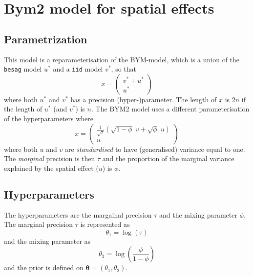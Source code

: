 \documentclass[a4paper,11pt]{article}
\begin{document}
\section*{Bym2 model for spatial effects}

\subsection*{Parametrization}

This model is a reparameterisation of the BYM-model, which is a union
of the \lstinline$besag$ model $u^{*}$ and a \lstinline$iid$ model
$v^{*}$, so that
\begin{displaymath}
    x =
    \begin{pmatrix}
        v^{*} + u^{*}\\
        u^{*}
    \end{pmatrix}
\end{displaymath}
where both $u^{*}$ and $v^{*}$ has a precision (hyper-)parameter.  The
length of $x$ is $2n$ if the length of $u^{*}$ (and $v^{*}$) is
$n$. The BYM2 model uses a different parameterisation of the
hyperparameters where
\begin{displaymath}
    x =
    \begin{pmatrix}
        \frac{1}{\sqrt{\tau}}\left(\sqrt{1-\phi} \;v +
          \sqrt{\phi} \;u\right)\\
        u
    \end{pmatrix}
\end{displaymath}
where both $u$ and $v$ are \emph{standardised} to have (generalised)
variance equal to one.  The \emph{marginal} precision is then $\tau$
and the proportion of the marginal variance explained by the spatial
effect ($u$) is $\phi$.

\subsection*{Hyperparameters}
The hyperparameters are the margainal precision $\tau$ and the mixing
parameter $\phi$.  The marginal precision $\tau$ is represented as
\begin{displaymath}
    \theta_{1} = \log(\tau)
\end{displaymath}
and the mixing parameter as
\begin{displaymath}
    \theta_{2} = \log\left(\frac{\phi}{1-\phi}\right)
\end{displaymath}
and the prior is defined on $\mathbf{\theta} = (\theta_{1}, \theta_{2})$.
\end{document}

